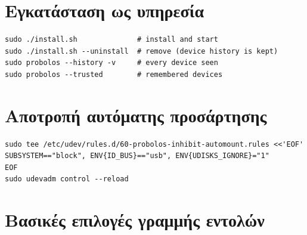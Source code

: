 \section{Εγκατάσταση ως υπηρεσία}

\begin{lstlisting}[language=shell,caption={Εγκατάσταση και απεγκατάσταση υπηρεσίας \en{systemd}.}]
sudo ./install.sh              # install and start
sudo ./install.sh --uninstall  # remove (device history is kept)
sudo probolos --history -v     # every device seen
sudo probolos --trusted        # remembered devices
\end{lstlisting}

\section{Αποτροπή αυτόματης προσάρτησης}

\begin{lstlisting}[language=shell,caption={Κανόνας \en{udev} για το στάδιο 4 και το \code{--watch-media}.}]
sudo tee /etc/udev/rules.d/60-probolos-inhibit-automount.rules <<'EOF'
SUBSYSTEM=="block", ENV{ID_BUS}=="usb", ENV{UDISKS_IGNORE}="1"
EOF
sudo udevadm control --reload
\end{lstlisting}

\section{Βασικές επιλογές γραμμής εντολών}

